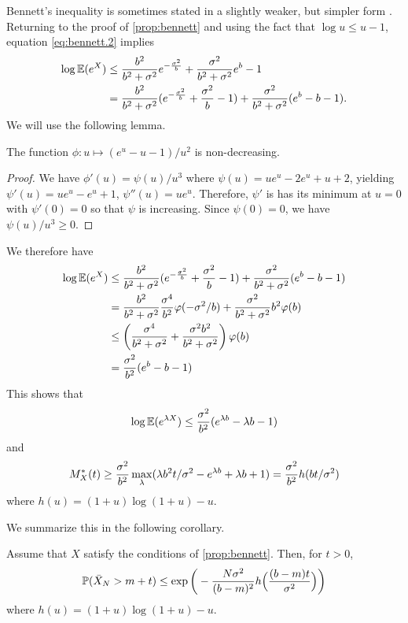 Bennett's inequality is sometimes stated in a slightly weaker, but simpler form \citep{massart2007concentration}. Returning to the proof of  \cref{prop:bennett} and using the fact that $\log u \leq u-1$,  equation \eqref{eq:bennett.2} implies
\begin{align*}
\log \bm{\mathbb E}(e^{X}) &\leq \frac{b^2}{b^2 + \sigma^2} e^{- \frac{\sigma^2}{b}} + \frac{\sigma^2}{b^2+\sigma^2} e^{b} - 1\\
& = \frac{b^2}{b^2 + \sigma^2} (e^{- \frac{\sigma^2}{b}} + \frac{\sigma^2}{b} - 1) + \frac{\sigma^2}{b^2+\sigma^2} (e^{b} - b - 1).
\end{align*}
We will use the following lemma.
\begin{lemma}
\label{lem:phi.inc}
The function $\phi: u\mapsto (e^u-u-1)/u^2$ is non-decreasing.
\end{lemma}
\begin{proof}
We have $\phi'(u) = \psi(u)/u^3$ where $\psi(u) = ue^u - 2e^u + u + 2$, yielding $\psi'(u) = u e^u - e^u + 1$, $\psi''(u) = u e^u$. Therefore,  $\psi'$ is has its minimum at $u=0$ with $\psi'(0)=0$ so that $\psi$ is increasing. Since $\psi(0)=0$, we have $\psi(u)/u^3 \geq 0$. 
\end{proof} 
We therefore have
\begin{align*}
\log \bm{\mathbb E}(e^{X}) &\leq \frac{b^2}{b^2 + \sigma^2} (e^{- \frac{\sigma^2}{b}} + \frac{\sigma^2}{b} - 1) + \frac{\sigma^2}{b^2+\sigma^2} (e^{b} - b - 1)\\
& = \frac{b^2}{b^2 + \sigma^2} \frac{\sigma^4}{b^2} \varphi(-\sigma^2/b) + \frac{\sigma^2}{b^2+\sigma^2} b^2\varphi(b)\\
&\leq \left(\frac{\sigma^4}{b^2 + \sigma^2} + \frac{\sigma^2b^2}{b^2+\sigma^2}\right)\varphi(b)\\
&=\frac{\sigma^2}{b^2} (e^b - b - 1)
\end{align*}
This shows that 
\[
\log \bm{\mathbb E}(e^{\lambda X}) \leq \frac{\sigma^2}{b^2} (e^{\lambda b} - \lambda  b - 1)
\] 
and 
\[
M_X^*(t) \geq \frac{\sigma^2}{b^2} \max_\lambda (\lambda b^2 t/\sigma^2 - e^{\lambda b} + \lambda  b + 1) = \frac{\sigma^2}{b^2} h(bt/\sigma^2)
\]
where $h(u) = (1+u)\log(1+u) - u$.

We summarize this in the following corollary.
\begin{corollary}
\label{coro:bennett.2}
Assume that  $X$ satisfy the conditions of \cref{prop:bennett}. Then, for $t>0$, 
\begin{equation}
\label{eq:bennett.bound.2}
\bm{\mathbb P}(\bar X_N > m+t) \leq \exp\bigg(-\frac{N\sigma^2}{(b-m)^2} h\Big(\frac{(b-m)t}{\sigma^2}\Big)\bigg)
\end{equation}
where $h(u) = (1+u)\log(1+u) - u$.
\end{corollary}

